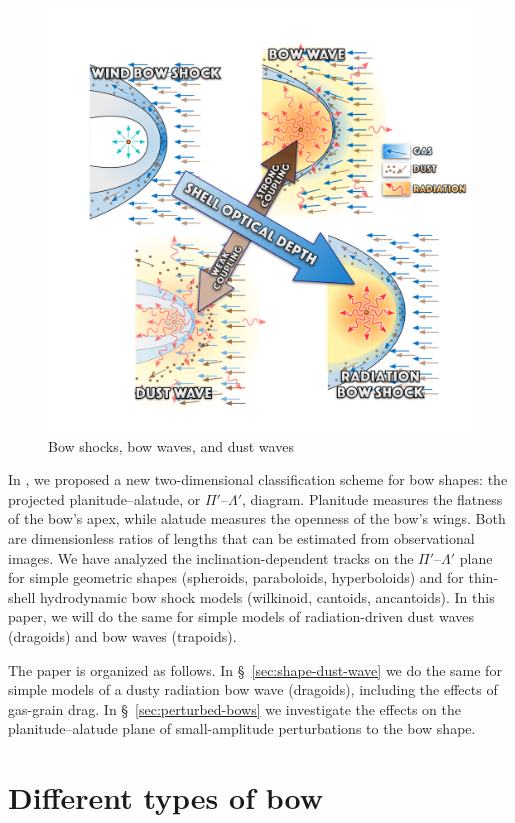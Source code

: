 \begin{figure}
  \centering
  \includegraphics[width=0.8\linewidth]{figs/bows-and-waves}
  \caption{Bow shocks, bow waves, and dust waves}
  \label{fig:3-types-bow}
\end{figure}

In \citet[][hereafter \PaperI{}]{Tarango-Yong:2018a}, we proposed a
new two-dimensional classification scheme for bow shapes: the
projected planitude--alatude, or \(\Pi'\)--\(\Lambda'\), diagram.  Planitude
measures the flatness of the bow's apex, while alatude measures the
openness of the bow's wings.  Both are dimensionless ratios of lengths
that can be estimated from observational images.  We have analyzed the
inclination-dependent tracks on the \(\Pi'\)--\(\Lambda'\) plane for simple
geometric shapes (spheroids, paraboloids, hyperboloids) and for
thin-shell hydrodynamic bow shock models (wilkinoid, cantoids,
ancantoids).  In this paper, we will do the same for simple models of
radiation-driven dust waves (dragoids) and bow waves (trapoids).

The paper is organized as follows.
%
In \S~\ref{sec:shape-dust-wave} we do the same for simple models of a
dusty radiation bow wave (dragoids), including the effects of
gas-grain drag.
%
In \S~\ref{sec:perturbed-bows} we investigate the effects on the
planitude--alatude plane of small-amplitude perturbations to the bow
shape.
%


\section{Different types of bow}
\label{sec:different-types-bow}

